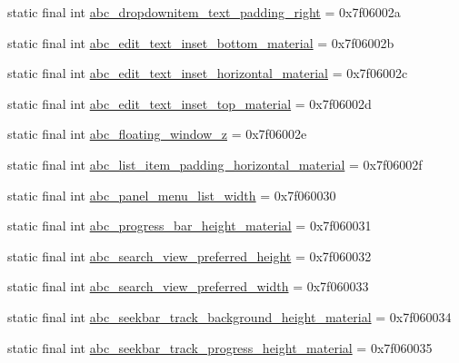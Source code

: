 \begin{DoxyCompactItemize}
static final int \mbox{\hyperlink{classandroid_1_1support_1_1design_1_1R_1_1dimen_aeec29d97219b2c603cdeb98e26965a7a}{abc\+\_\+dropdownitem\+\_\+text\+\_\+padding\+\_\+right}} = 0x7f06002a
\item 
static final int \mbox{\hyperlink{classandroid_1_1support_1_1design_1_1R_1_1dimen_a0985e21f84e746dec037773a3abb1113}{abc\+\_\+edit\+\_\+text\+\_\+inset\+\_\+bottom\+\_\+material}} = 0x7f06002b
\item 
static final int \mbox{\hyperlink{classandroid_1_1support_1_1design_1_1R_1_1dimen_aedd7d9d99b8c4f081a9582ae33e056c4}{abc\+\_\+edit\+\_\+text\+\_\+inset\+\_\+horizontal\+\_\+material}} = 0x7f06002c
\item 
static final int \mbox{\hyperlink{classandroid_1_1support_1_1design_1_1R_1_1dimen_ac9ec7c237aed1411b8bf85d1f2de801b}{abc\+\_\+edit\+\_\+text\+\_\+inset\+\_\+top\+\_\+material}} = 0x7f06002d
\item 
static final int \mbox{\hyperlink{classandroid_1_1support_1_1design_1_1R_1_1dimen_a7c730cc453da03509011d0f75524689a}{abc\+\_\+floating\+\_\+window\+\_\+z}} = 0x7f06002e
\item 
static final int \mbox{\hyperlink{classandroid_1_1support_1_1design_1_1R_1_1dimen_a2876e7547b2e4660135953655f79ff25}{abc\+\_\+list\+\_\+item\+\_\+padding\+\_\+horizontal\+\_\+material}} = 0x7f06002f
\item 
static final int \mbox{\hyperlink{classandroid_1_1support_1_1design_1_1R_1_1dimen_a365e3bc959933ee12d8b935ea42253de}{abc\+\_\+panel\+\_\+menu\+\_\+list\+\_\+width}} = 0x7f060030
\item 
static final int \mbox{\hyperlink{classandroid_1_1support_1_1design_1_1R_1_1dimen_af760291af5481fd29ed5b6c6a65c8033}{abc\+\_\+progress\+\_\+bar\+\_\+height\+\_\+material}} = 0x7f060031
\item 
static final int \mbox{\hyperlink{classandroid_1_1support_1_1design_1_1R_1_1dimen_a1e5ec451633a8be5193491dd98660a83}{abc\+\_\+search\+\_\+view\+\_\+preferred\+\_\+height}} = 0x7f060032
\item 
static final int \mbox{\hyperlink{classandroid_1_1support_1_1design_1_1R_1_1dimen_a6901ca34b7cc25c725a55d9973e6c0c5}{abc\+\_\+search\+\_\+view\+\_\+preferred\+\_\+width}} = 0x7f060033
\item 
static final int \mbox{\hyperlink{classandroid_1_1support_1_1design_1_1R_1_1dimen_a074860b4cf4b4198303c60e7b2efd3cc}{abc\+\_\+seekbar\+\_\+track\+\_\+background\+\_\+height\+\_\+material}} = 0x7f060034
\item 
static final int \mbox{\hyperlink{classandroid_1_1support_1_1design_1_1R_1_1dimen_adbd12b1ded065c1a2ebba69f73914064}{abc\+\_\+seekbar\+\_\+track\+\_\+progress\+\_\+height\+\_\+material}} = 0x7f060035

\end{DoxyCompactItemize}
